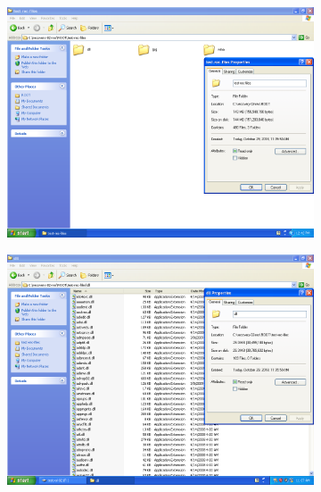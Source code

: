\documentclass[
	a4paper,
	oneside,
	DIV = 12,
	fontsize = 13pt,
	headings = normal,
]{scrartcl}
\begin{document}
		\begin{figure}
			\centering
			\begin{subfigure}{0.5\columnwidth}
				\centering
				\includegraphics[height = 9\baselineskip]{./assets/y03s01-pcdiag-lab-03-p15.png}
				\caption{}
				\label{subfig:05-01-root}
			\end{subfigure}%
			\begin{subfigure}{0.5\columnwidth}
				\centering
				\includegraphics[height = 9\baselineskip]{./assets/y03s01-pcdiag-lab-03-p16.png}
				\caption{}
				\label{subfig:05-02-jpg}
			\end{subfigure}
			\begin{subfigure}{0.5\columnwidth}
				\centering

\end{subfigure}
\end{figure}
\end{document}
